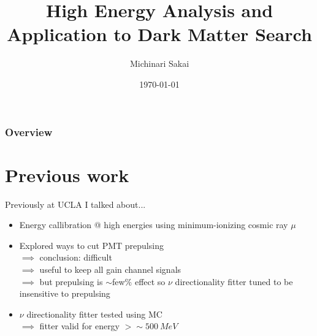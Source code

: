 \documentclass{beamer}
\title[High Energy Analysis]{High Energy Analysis and Application to Dark Matter
Search} %
\author{Michinari Sakai} %
\institute[UH] %
{
University of Hawaii, Manoa \\ %
\medskip
\textit{michinar@hawaii.edu} %
}
\date{\today} %
\begin{document}
\begin{frame}
\titlepage %
\end{frame}

\begin{frame}
\frametitle{Overview} %
\tableofcontents %
\end{frame}




\section{Previous work}
\begin{frame}[t]{Previously at UCLA I talked about...}
	\begin{itemize}
		\item Energy callibration @ high energies using minimum-ionizing cosmic
			ray $\mu$
		\item Explored ways to cut PMT prepulsing\\
			$\implies$ conclusion: difficult\\
			$\implies$ useful to keep all gain channel signals\\
			$\implies$ but prepulsing is $\sim$few$\%$ effect so $\nu$
			directionality fitter tuned to be insensitive to prepulsing
		\item $\nu$ directionality fitter tested using MC\\
			$\implies$ fitter valid for energy $> \sim\SI{500}{MeV}$
	\end{itemize}
\end{frame}
\end{document}
